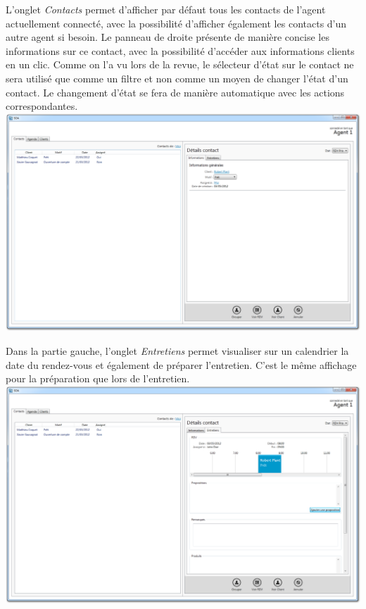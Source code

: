 L'onglet \textit{Contacts } permet d'afficher par défaut tous les contacts de l'agent actuellement connecté, avec la possibilité d'afficher également les contacts d'un autre agent si besoin. Le panneau de droite présente de manière concise les informations sur ce contact, avec la possibilité d'accéder aux informations clients en un clic.
Comme on l'a vu lors de la revue, le sélecteur d'état sur le contact ne sera utilisé que comme un filtre et non comme un moyen de changer l'état d'un contact. Le changement d'état se fera de manière automatique avec les actions correspondantes.
\includegraphics[width=\textwidth]{../../ihm/pngIHM/ListeContacts.png}

Dans la partie gauche, l'onglet \textit{Entretiens} permet visualiser sur un calendrier la date du rendez-vous et également de préparer l'entretien. C'est le même affichage pour la préparation que lors de l'entretien.
\includegraphics[width=\textwidth]{../../ihm/pngIHM/ContactEntretiens1.png}

